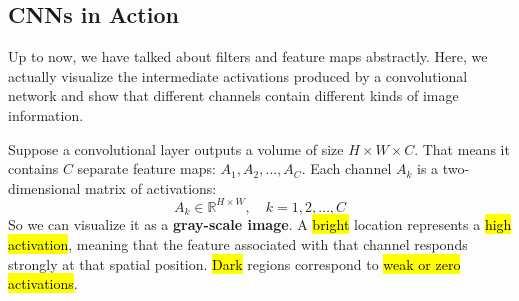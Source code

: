 \subsection{CNNs in Action}\label{sec:cnns-in-action}

Up to now, we have talked about filters and feature maps abstractly. Here, we actually visualize the intermediate activations produced by a convolutional network and show that different channels contain different kinds of image information.

\highspace
Suppose a convolutional layer outputs a volume of size $H \times W \times C$. That means it contains $C$ separate feature maps: $A_1, A_2, \ldots, A_C$. Each channel $A_k$ is a two-dimensional matrix of activations:
\begin{equation*}
    A_k \in \mathbb{R}^{H \times W}, \quad k = 1, 2, \ldots, C
\end{equation*}
So we can visualize it as a \textbf{gray-scale image}. A \hl{bright} location represents a \hl{high activation}, meaning that the feature associated with that channel responds strongly at that spatial position. \hl{Dark} regions correspond to \hl{weak or zero activations}.

